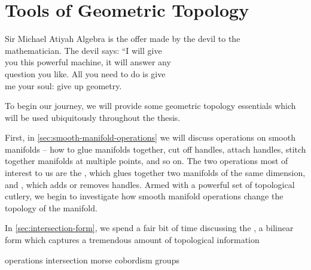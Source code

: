\chapter{Tools of Geometric Topology}\label{chap:fundamentals}

%
%

\begin{epigraph}{20em}{Sir Michael Atiyah}
	Algebra is the offer made by the devil to the \\
	mathematician. The devil says: ``I will give \\
	you this powerful machine, it will answer any \\
	question you like. All you need to do is give\\
	me your soul: give up geometry.
\end{epigraph}

\noindent
To begin our journey, we will provide some geometric topology essentials which will be used ubiquitously throughout the thesis.

First, in \cref{sec:smooth-manifold-operations} we will discuss operations on smooth manifolds -- how to glue manifolds together, cut off handles, attach handles, stitch together manifolds at multiple points, and so on. The two operations most of interest to us are the , which glues together two manifolds of the same dimension, and , which adds or removes handles. 
Armed with a powerful set of topological cutlery, we begin to investigate how smooth manifold operations change the topology of the manifold. 

In \cref{sec:intersection-form}, we spend a fair bit of time discussing the , a bilinear form which captures a tremendous amount of topological information 



{operations}
{intersection}
{morse}
{cobordism}
{groups}
